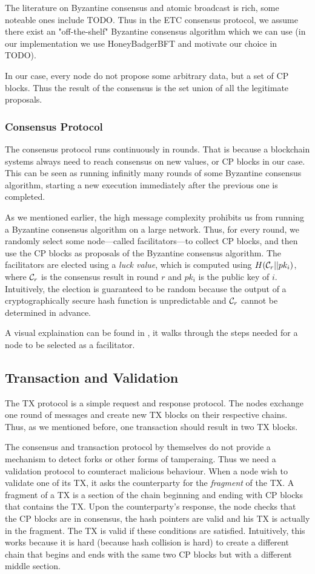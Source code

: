 The literature on Byzantine consensus and atomic broadcast is rich, some noteable ones include TODO.
Thus in the ETC consensus protocol, we assume there exist an "off-the-shelf" Byzantine consensus algorithm which we can use
(in our implementation we use HoneyBadgerBFT and motivate our choice in TODO).

In our case, every node do not propose some arbitrary data, but a set of CP blocks.
Thus the result of the consensus is the set union of all the legitimate proposals.

\subsubsection*{Consensus Protocol} 
The consensus protocol runs continuously in rounds.
That is because a blockchain systems always need to reach consensus on new values, or CP blocks in our case.
This can be seen as running infinitly many rounds of some Byzantine consensus algorithm,
starting a new execution immediately after the previous one is completed.

As we mentioned earlier, the high message complexity prohibits us from running a Byzantine consensus algorithm on a large network.
Thus, for every round, we randomly select some node---called facilitators---to collect CP blocks,
and then use the CP blocks as proposals of the Byzantine consensus algorithm.
The facilitators are elected using a \emph{luck value}, which is computed using $H(\mathcal{C}_r || pk_i)$,
where $\mathcal{C}_r$ is the consensus result in round $r$ and $pk_i$ is the public key of $i$.
Intuitively, the election is guaranteed to be random 
because the output of a cryptographically secure hash function is unpredictable and $\mathcal{C}_r$ cannot be determined in advance.

A visual explaination can be found in ,
it walks through the steps needed for a node to be selected as a facilitator.

\subsection{Transaction and Validation}
The TX protocol is a simple request and response protocol.
The nodes exchange one round of messages and create new TX blocks on their respective chains.
Thus, as we mentioned before, one transaction should result in two TX blocks.

The consensus and transaction protocol by themselves do not provide a mechanism to detect forks or other forms of tamperaing.
Thus we need a validation protocol to counteract malicious behaviour.
When a node wish to validate one of its TX, it asks the counterparty for the \emph{fragment} of the TX.
A fragment of a TX is a section of the chain beginning and ending with CP blocks that contains the TX.
Upon the counterparty's response, the node checks that the CP blocks are in consensus, the hash pointers are valid and his TX is actually in the fragment.
The TX is valid if these conditions are satisfied.
Intuitively, this works because it is hard (because hash collision is hard)
 to create a different chain that begins and ends with the same two CP blocks but with a different middle section.


